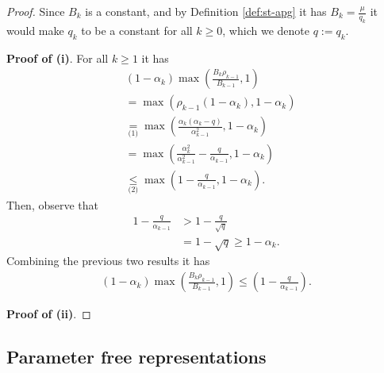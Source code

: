 \documentclass[12pt]{article}
\begin{document}
        \begin{proof}
            Since $B_k$ is a constant, and by Definition \ref{def:st-apg} it has $B_k = \frac{\mu}{q_k}$ it would make $q_k$ to be a constant for all $k \ge 0$, which we denote $q := q_k$. 
            \par
            \textbf{Proof of (i)}. 
            For all $k \ge 1$ it has 
            \begin{align*}
                & (1 - \alpha_k)\max\left(
                    \frac{B_k\rho_{k - 1}}{B_{k - 1}}, 1
                \right)
                \\
                &= \max(\rho_{k - 1}(1 - \alpha_k), 1 - \alpha_k) 
                \\
                &\underset{\text{(1)}}{=} \max\left(
                    \frac{\alpha_k(\alpha_k - q)}{\alpha_{k - 1}^2}, 1 - \alpha_k
                \right)
                \\
                &= \max\left(
                    \frac{\alpha_k^2}{\alpha_{k - 1}^2} - \frac{q}{\alpha_{k - 1}}, 1 - \alpha_k
                \right)
                \\
                &\underset{\text{(2)}}{\le} 
                \max\left(
                    1 - \frac{q}{\alpha_{k - 1}}, 1 - \alpha_k
                \right). 
            \end{align*}
            Then, observe that
            \begin{align*}
                1 - \frac{q}{\alpha_{k - 1}} &> 1 - \frac{q}{\sqrt{q}}
                \\
                &= 1 - \sqrt{q} \ge 1 - \alpha_k. 
            \end{align*}
            Combining the previous two results it has 
            \begin{align*}
                (1 - \alpha_k)\max\left(
                    \frac{B_k\rho_{k - 1}}{B_{k - 1}}, 1
                \right) \le 
                \left(1 - \frac{q}{\alpha_{k - 1}}\right).
            \end{align*}
            \par 
            \textbf{Proof of (ii)}. 
            
        \end{proof}
    \subsection{Parameter free representations}
        
        
\end{document}

